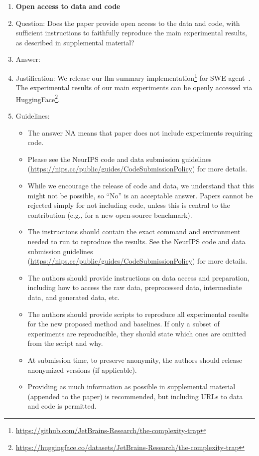 \documentclass{article}
\begin{document}
\begin{enumerate}
\item {\bf Open access to data and code}
    \item[] Question: Does the paper provide open access to the data and code, with sufficient instructions to faithfully reproduce the main experimental results, as described in supplemental material?
    \item[] Answer: \answerYes{} %
    \item[] Justification: We release our \ac{llm}-summary implementation\footnote{\url{https://github.com/JetBrains-Research/the-complexity-trap}} for SWE-agent~\cite{yang_swe-agent_2024}. The experimental results of our main experiments can be openly accessed via HuggingFace\footnote{\url{https://huggingface.co/datasets/JetBrains-Research/the-complexity-trap}}.
    \item[] Guidelines:
    \begin{itemize}
        \item The answer NA means that paper does not include experiments requiring code.
        \item Please see the NeurIPS code and data submission guidelines (\url{https://nips.cc/public/guides/CodeSubmissionPolicy}) for more details.
        \item While we encourage the release of code and data, we understand that this might not be possible, so “No” is an acceptable answer. Papers cannot be rejected simply for not including code, unless this is central to the contribution (e.g., for a new open-source benchmark).
        \item The instructions should contain the exact command and environment needed to run to reproduce the results. See the NeurIPS code and data submission guidelines (\url{https://nips.cc/public/guides/CodeSubmissionPolicy}) for more details.
        \item The authors should provide instructions on data access and preparation, including how to access the raw data, preprocessed data, intermediate data, and generated data, etc.
        \item The authors should provide scripts to reproduce all experimental results for the new proposed method and baselines. If only a subset of experiments are reproducible, they should state which ones are omitted from the script and why.
        \item At submission time, to preserve anonymity, the authors should release anonymized versions (if applicable).
        \item Providing as much information as possible in supplemental material (appended to the paper) is recommended, but including URLs to data and code is permitted.
    \end{itemize}



\end{enumerate}
\end{document}

